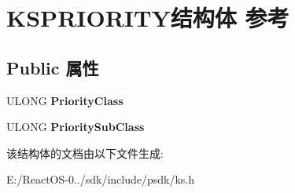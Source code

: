 \hypertarget{struct_k_s_p_r_i_o_r_i_t_y}{}\section{K\+S\+P\+R\+I\+O\+R\+I\+T\+Y结构体 参考}
\label{struct_k_s_p_r_i_o_r_i_t_y}
\subsection*{Public 属性}
\begin{DoxyCompactItemize}
\item 
\mbox{\label{struct_k_s_p_r_i_o_r_i_t_y_a3c28c985e9d055cfacb901761311f75d}} 
U\+L\+O\+NG {\bfseries Priority\+Class}
\item 
\mbox{\label{struct_k_s_p_r_i_o_r_i_t_y_afa60e98100c79a97dd08096c2db0df76}} 
U\+L\+O\+NG {\bfseries Priority\+Sub\+Class}
\end{DoxyCompactItemize}


该结构体的文档由以下文件生成\+:\begin{DoxyCompactItemize}
\item 
E\+:/\+React\+O\+S-\/0../sdk/include/psdk/ks.\+h\end{DoxyCompactItemize}
